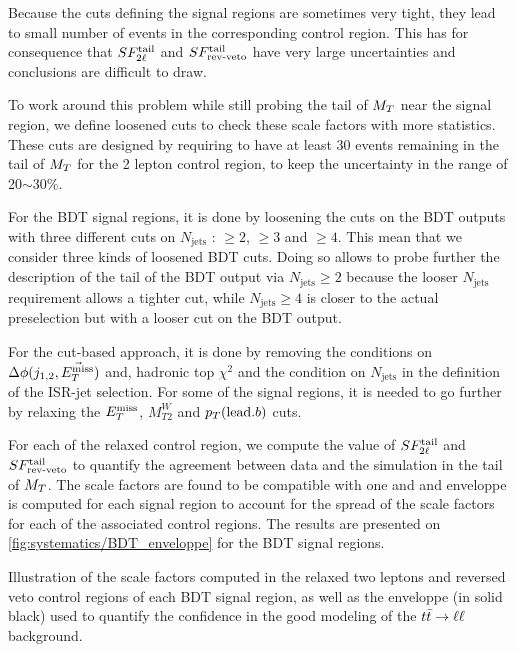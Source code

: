             Because the cuts defining the signal regions are sometimes very tight, they lead to
            small number of events in the corresponding control region. This has for consequence that
            $SF_{2\ell}^{\text{tail}}$ and $SF_{\text{rev-veto}}^{\text{tail}}$ have very large uncertainties and conclusions are
            difficult to draw.

            To work around this problem while still probing the tail of $M_T$ near the signal
            region, we define loosened cuts to check these scale factors with more statistics.
            These cuts are designed by requiring to have at least 30 events remaining in the tail of
            $M_T$ for the 2 lepton control region, to keep the uncertainty in the range of 20$\sim$30\%.
            
            For the BDT signal regions, it is done by loosening the cuts on the BDT outputs with
            three different cuts on $N_\text{jets}$ : $\geq 2$, $\geq 3$ and $\geq 4$. This mean
            that we consider three kinds of loosened BDT cuts. Doing so allows to probe further the
            description of the tail of the BDT output via $N_\text{jets} \geq 2$ because the looser
            $N_\text{jets}$ requirement allows a tighter cut, while $N_\text{jets} \geq 4$ is closer
            to the actual preselection but with a looser cut on the BDT output. 

            For the cut-based approach, it is done by removing the conditions on $\Delta \phi( j_{1,2},
            \vec{E_T^\text{miss}} )$ and, hadronic top $\chi^2$ and the condition on $N_\text{jets}$ in the definition
            of the ISR-jet selection. For some of the signal regions, it is needed to go further by 
            relaxing the $E_T^\text{miss}$, $M_{T2}^W$ and $p_T(\text{lead.} b)$ cuts. 

            For each of the relaxed control region, we compute the value of $SF_{2\ell}^{\text{tail}}$ and
            $SF_{\text{rev-veto}}^{\text{tail}}$ to quantify the agreement between data and the simulation in the tail of $M_T$.
            The scale factors are found to be compatible with one and and enveloppe is computed for
            each signal region to account for the spread of the scale factors for each of the
            associated control regions. The results are presented on \ref{fig:systematics/BDT_enveloppe} for
            the BDT signal regions.

                         {Illustration of the scale factors computed in the relaxed two 
                         leptons and reversed veto control regions of each BDT signal region, 
                         as well as the enveloppe (in solid black) used to quantify the 
                         confidence in the good modeling of the $t\bar{t} \rightarrow \ell \ell$ background.}

